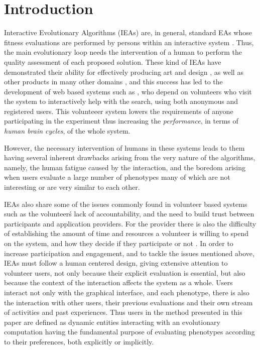 \documentclass[conference]{IEEEtran}
\begin{document}
\IEEEpeerreviewmaketitle



\section{Introduction}
Interactive Evolutionary Algorithms (IEAs) are, in general, standard EAs whose
fitness evaluations are performed by persons within an interactive 
system \cite{eiben2015interactive}.  Thus, the main evolutionary loop needs the intervention of a
human to perform the quality assessment of each proposed solution.
These kind of IEAs have demonstrated their ability for effectively
producing art and design \cite{Bentley:1999:intro,Sims:1991,todd:1992},
as well as other products in many other domains \cite{ie1}, and this
success has led to the development of web based systems such as \cite{picbreeder},
who depend on volunteers who visit the system to interactively help
with the search, using both anonymous and registered users. This
volunteeer system lowers the requirements of anyone participating in
the experiment thus increasing the {\em performance}, in terms of {\em
  human brain cycles}, of the whole system.


However, the necessary intervention of humans in these systems leads
to them having several inherent drawbacks arising from the very nature of 
the algorithms, namely, the human fatigue caused by the interaction, and
the boredom arising when users evaluate a large number of phenotypes 
many of which are not interesting or are very similar to each other.


IEAs also share some of the issues commonly found in volunteer based systems
\cite{sarmenta2001volunteer,web:BOINC} such as the volunteer\'s lack of accountability,
and the need to build trust between participants and application providers. 
For the provider there is also the difficulty of establishing 
the amount of time and resources
a volunteer is willing to spend on the system, and how they decide if they
participate or not \cite{JJ:2016}. In order to increase participation and 
engagement, and to tackle the issues mentioned above,  
IEAs must follow a human centered design, %
giving extensive attention 
to volunteer users, not only because their
explicit evaluation is essential, but also because the context of the 
interaction affects the system as a whole. Users interact not only with the graphical
interface, and each phenotype, there is also the interaction
with other users, their previous evaluations and their own stream of activities
and past experiences. Thus users in the method presented in this paper are defined as dynamic entities 
interacting with an evolutionary computation having the fundamental purpose 
of evaluating phenotypes according to their preferences,
both explicitly or implicitly. 
\end{document}
